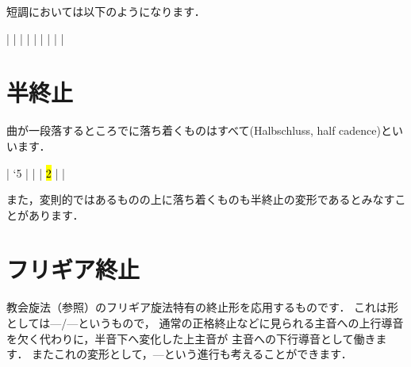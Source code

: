 \documentclass[dvipdfmx,uplatex,b5paper,openany,jbase=12Q,nomag*,textwidth-limit=44%
               ]{gachimuchi}[2020/05/05]
\begin{document}
短調においては以下のようになります．

\begin{Music}[.6\linewidth]
  \generalmeter{\meterC}%
  \Startpiece%
  \NOTEs%
  |%
  \en\bar%
  \NOTEs%
  |%
  \en\doublebar%
  \NOTEs%
  |%
  \en\bar%
  \NOTEs%
  |%
  \en\doublebar%
  \NOTEs%
  |%
  \en\bar%
  \NOTEs%
  |%
  \en\setdoublebar%
  \endpiece%
\end{Music}

\section{半終止}
曲が一段落するところで\Gnv に落ち着くものはすべて\xkanjispace(Halbschluss, half cadence)といいます．

\begin{Music}[.6\linewidth]
  \generalmeter{\meterC}%
  \Startpiece%
  \NOtes%
  \sk{}|%
  \lq{5}%
  \en\bar%
  \NOtes%
  |%
  \en\NOTes%
  |%
  \hl{2}%
  \en\bar
  \NOtes%
  \Mryaku|%
  \Mryaku%
  \en\setemptybar%
  \endpiece
\end{Music}

また，変則的ではあるものの\Gniv 上に落ち着くものも半終止の変形であるとみなすことがあります．

\section{フリギア終止}
教会旋法（参照）のフリギア旋法特有の終止形を応用するものです．
これは形としては\Gniv\Min---\bFlat\Gnvii\Min/\bFlat\Gnii---\Gni というもので，
通常の正格終止などに見られる主音への上行導音を欠く代わりに，半音下へ変化した上主音が
主音への下行導音として働きます．
またこれの変形として，\bFlat\Gnii---\Gni という進行も考えることができます．
\end{document}
